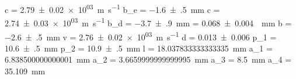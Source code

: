 c = \SI{+2.79(2)e+03}{\meter\per\second}
b_e = \SI{-1.6(5)}{\milli\meter}
c = \SI{+2.74(3)e+03}{\meter\per\second}
b_d = \SI{-3.7(9)}{\milli\meter}
\alpha = \SI{+0.068(4)}{\per\milli\meter}
b = \SI{-2.6(5)}{\milli\meter}
v = \SI{+2.76(2)e+03}{\meter\per\second}
d = \SI{+0.013(6)}{}
p_1 = \SI{+10.6(5)}{\milli\meter}
p_2 = \SI{+10.9(5)}{\milli\meter}
l = \SI[]{18.037833333333335}{\milli\meter}
a_1 = \SI[]{6.838500000000001}{\milli\meter}
a_2 = \SI[]{3.6659999999999995}{\milli\meter}
a_3 = \SI[]{8.5}{\milli\meter}
a_4 = \SI[]{35.109}{\milli\meter}
